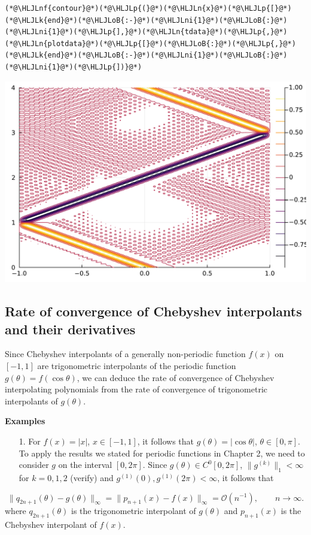 \documentclass[12pt,a4paper]{article}
\newcommand{\HLJLk}[1]{\textcolor[RGB]{148,91,176}{\textbf{#1}}}
\newcommand{\HLJLn}[1]{#1}
\newcommand{\HLJLnf}[1]{\textcolor[RGB]{66,102,213}{#1}}
\newcommand{\HLJLni}[1]{\textcolor[RGB]{59,151,46}{#1}}
\newcommand{\HLJLoB}[1]{\textcolor[RGB]{102,102,102}{\textbf{#1}}}
\newcommand{\HLJLp}[1]{#1}
\begin{document}
\begin{lstlisting}
(*@\HLJLnf{contour}@*)(*@\HLJLp{(}@*)(*@\HLJLn{x}@*)(*@\HLJLp{[}@*)(*@\HLJLk{end}@*)(*@\HLJLoB{:-}@*)(*@\HLJLni{1}@*)(*@\HLJLoB{:}@*)(*@\HLJLni{1}@*)(*@\HLJLp{],}@*)(*@\HLJLn{tdata}@*)(*@\HLJLp{,}@*)(*@\HLJLn{plotdata}@*)(*@\HLJLp{[}@*)(*@\HLJLoB{:}@*)(*@\HLJLp{,}@*)(*@\HLJLk{end}@*)(*@\HLJLoB{:-}@*)(*@\HLJLni{1}@*)(*@\HLJLoB{:}@*)(*@\HLJLni{1}@*)(*@\HLJLp{])}@*)
\end{lstlisting}

\includegraphics[width=\linewidth]{jl_P71Faz/Chapter3_18_1.pdf}

\subsection{Rate of convergence of Chebyshev interpolants and their derivatives}
Since Chebyshev interpolants of a generally non-periodic function $f(x)$ on $[-1, 1]$ are trigonometric interpolants of the periodic function $g(\theta) = f(\cos\theta)$, we can deduce the rate of convergence of Chebyshev interpolating polynomials from the rate of convergence of trigonometric interpolants of $g(\theta)$.

\textbf{Examples}

\begin{itemize}
\item[1. ] For $f(x) = \vert x \vert$, $x \in [-1, 1]$, it follows that $g(\theta) = \vert \cos\theta \vert$, $\theta \in [0, \pi]$.  To apply the results we stated for periodic functions in Chapter 2, we need to consider $g$ on the interval $[0, 2\pi]$.  Since $g(\theta) \in C^{0}[0, 2\pi]$, $\| g^{(k)}\|_1 < \infty$ for $k = 0, 1, 2$ (verify) and $g^{(1)}(0), g^{(1)}(2\pi) < \infty$, it follows that

\end{itemize}
\[
\| q_{2n+1}(\theta) - g(\theta) \|_{\infty} = \| p_{n+1}(x) - f(x) \|_{\infty} = \mathcal{O}\left( n^{-1} \right), \qquad n \to \infty.
\]
where $q_{2n+1}(\theta)$ is the trigonometric interpolant of $g(\theta)$ and $p_{n+1}(x)$ is the Chebyshev interpolant of $f(x)$.
\end{document}
